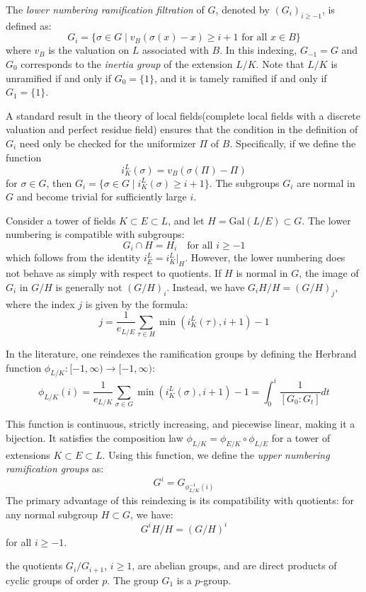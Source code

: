 The \textit{lower numbering ramification filtration} of $G$, denoted by $(G_i)_{i \geq -1}$, is defined as:
\[ 
G_i = \{ \sigma \in G \mid v_B(\sigma (x) - x) \geq i + 1 \text{ for all } x \in B \} 
\]
where $v_B$ is the valuation on $L$ associated with $B$. In this indexing, $G_{-1} = G$ and $G_0$ 
corresponds to the \textit{inertia group} of the extension $L/K$. Note that $L/K$ is unramified if and only if 
$G_0 = \{1\}$, and it is tamely ramified if and only if $G_1 = \{1\}$.

A standard result in the theory of local fields(complete local fields with a discrete valuation and perfect residue field) 
ensures that the condition in the definition of $G_i$ need only be checked for the uniformizer $\Pi$ of $B$. 
Specifically, if we define the function
\[ 
i^L_K(\sigma) = v_B(\sigma(\Pi) - \Pi) 
\]
for $\sigma \in G$, then $G_i = \{ \sigma \in G \mid i^L_K(\sigma) \geq i + 1 \}$. 
The subgroups $G_i$ are normal in $G$ and become trivial for sufficiently large $i$.

Consider a tower of fields $K \subset E \subset L$, and let $H = \text{Gal}(L/E) \subset G$. The lower numbering is compatible with subgroups:
\[ 
G_i \cap H = H_i \quad \text{for all } i \geq -1 
\]
which follows from the identity $i^L_E = i^L_K|_{H}$. 
However, the lower numbering does not behave as simply with respect to quotients. If $H$ is normal in $G$, the image of $G_i$ in $G/H$ is generally not $(G/H)_i$. 
Instead, we have $G_i H / H = (G/H)_j$, where the index $j$ is given by the formula:
\[ 
j = \frac{1}{e_{L/E}} \sum_{\tau \in H} \min(i^L_K(\tau), i+1) - 1 
\]


In the literature, one reindexes the ramification groups by defining the Herbrand function $\phi_{L/K} : [-1, \infty ) \to [-1, \infty )$:
\[ \phi_{L/K}(i) = \frac{1}{e_{L/K}}\sum_{\sigma \in G} \min(i^L_K(\sigma), i+1)-1 = \int _0^i \frac{1}{[G_0 : G_t]} dt \]

This function is continuous, strictly increasing, and piecewise linear, making it a bijection. 
It satisfies the composition law $\phi_{L/K} = \phi_{E/K} \circ \phi_{L/E}$ for a tower of extensions $K \subset E \subset L$. 
Using this function, we define the \textit{upper numbering ramification groups} as:
\[ 
G^i = G_{\phi_{L/K}^{-1}(i)} 
\]
The primary advantage of this reindexing is its compatibility with quotients: for any normal subgroup $H \subset G$, we have:
\[ 
G^i H / H = (G/H)^i 
\]
for all $i \geq -1$.


\begin{prop}
    the quotients $G_i/G_{i+1}$, $i \geq 1$, are abelian groups, and are direct products of cyclic groups of order $p$. 
    The group $G_1$ is a $p$-group.
\end{prop}


